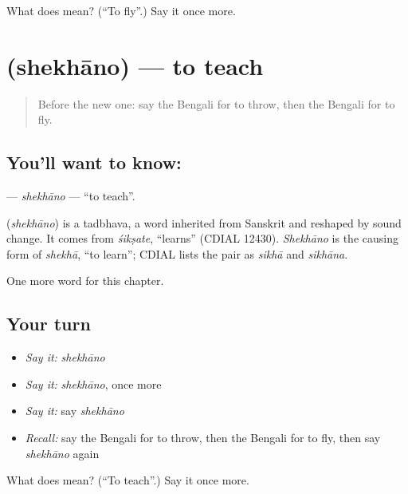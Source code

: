 \begin{tcolorbox}[breakable,colback=teal!4,colframe=teal!35!black,title={Before you move on}]
What does  mean? (\textquotedblleft{}To fly\textquotedblright{}.) Say it once more.
\end{tcolorbox}
\section[\texorpdfstring{\bn{শেখানো} (shekhāno)}{শেখানো (shekhāno)}]{ (shekhāno) — to teach}

\label{lesson:BN-C53-shekhano}



\begin{quote}
Before the new one: say the Bengali for to throw, then the Bengali for to fly.
\end{quote}

\subsection*{You'll want to know: }
\textbf{} — \emph{shekhāno} — \textquotedblleft{}to teach\textquotedblright{}.

\begin{cousinweb}
\textbf{} (\emph{shekhāno}) is a tadbhava, a word inherited from Sanskrit and reshaped by sound change. It comes from \emph{śikṣate}, \textquotedblleft{}learns\textquotedblright{} (CDIAL 12430). \emph{Shekhāno} is the causing form of \emph{shekhā}, \textquotedblleft{}to learn\textquotedblright{}; CDIAL lists the pair as \emph{sikhā} and \emph{sikhāna}.
\end{cousinweb}

\begin{grammarlens}[title={What you've built}]
One more word for this chapter.
\end{grammarlens}

\subsection*{Your turn}
\begin{itemize}
\raggedright
  \item \emph{Say it:} \emph{shekhāno}
  \item \emph{Say it:} \emph{shekhāno}, once more
  \item \emph{Say it:} say \emph{shekhāno}
  \item \emph{Recall:} say the Bengali for to throw, then the Bengali for to fly, then say \emph{shekhāno} again
\end{itemize}

\begin{tcolorbox}[breakable,colback=teal!4,colframe=teal!35!black,title={Before you move on}]
What does  mean? (\textquotedblleft{}To teach\textquotedblright{}.) Say it once more.
\end{tcolorbox}
